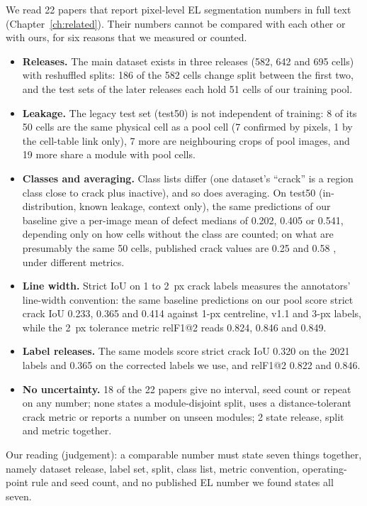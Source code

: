 We read 22 papers that report pixel-level EL segmentation numbers in full text (Chapter~\ref{ch:related}). Their numbers cannot be
compared with each other or with ours, for six reasons that we measured or counted.
\begin{itemize}
  \item \textbf{Releases.} The main dataset exists in three releases (582, 642 and 695 cells) with reshuffled splits: 186 of the 582
  cells change split between the first two, and the test sets of the later releases each hold 51 cells of our training pool.
  \item \textbf{Leakage.} The legacy test set (test50) is not independent of training: 8 of its 50 cells are the same physical
  cell as a pool cell (7 confirmed by pixels, 1 by the cell-table link only), 7 more are neighbouring crops of pool images, and 19
  more share a module with pool cells.
  \item \textbf{Classes and averaging.} Class lists differ (one dataset's ``crack'' is a region class close to crack plus inactive),
  and so does averaging. On test50 (in-distribution, known leakage, context only), the same predictions of our baseline give a
  per-image mean of defect medians of 0.202, 0.405 or 0.541, depending only on how cells without the class are counted; on what are
  presumably the same 50 cells, published crack values are 0.25 \citep{pratt2023benchmark} and 0.58 \citep{jha2025pvs3}, under
  different metrics.
  \item \textbf{Line width.} Strict IoU on 1 to 2~px crack labels measures the annotators' line-width convention: the same baseline
  predictions on our pool score strict crack IoU 0.233, 0.365 and 0.414 against 1-px centreline, v1.1 and 3-px labels, while the
  2~px tolerance metric relF1@2 reads 0.824, 0.846 and 0.849.
  \item \textbf{Label releases.} The same models score strict crack IoU 0.320 on the 2021 labels and 0.365 on the corrected labels
  we use, and relF1@2 0.822 and 0.846.
  \item \textbf{No uncertainty.} 18 of the 22 papers give no interval, seed count or repeat on any number; none states a
  module-disjoint split, uses a distance-tolerant crack metric or reports a number on unseen modules; 2 state release, split and
  metric together.
\end{itemize}
Our reading (judgement): a comparable number must state seven things together, namely dataset release, label set, split, class
list, metric convention, operating-point rule and seed count, and no published EL number we found states all seven.

